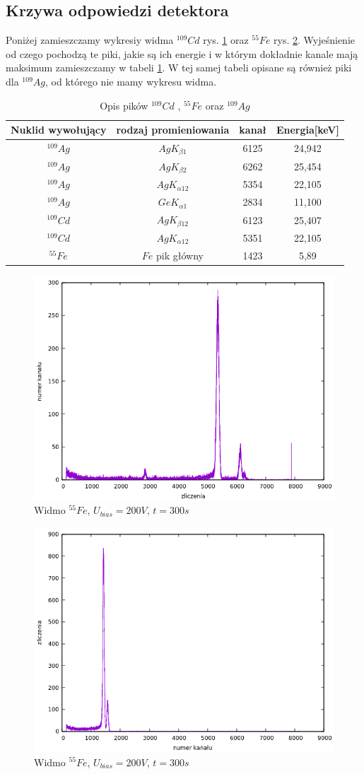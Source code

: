 \documentclass[11pt,a4paper]{article}
\begin{document}
\subsection{Krzywa odpowiedzi detektora}
Poniżej zamieszczamy wykresiy widma $^{109}Cd$ rys. \ref{figp1} oraz $^{55}Fe$ rys. \ref{figp2}. Wyjeśnienie od czego pochodzą te piki, jakie są ich energie i w którym dokładnie kanale mają maksimum zamieszczamy w tabeli \ref{tabodp}. W tej samej tabeli opisane są również piki dla $^{109}Ag$, od którego nie mamy wykresu widma.
\begin{longtable}{c|c|c|c}
\caption{Opis pików $^{109}Cd$ , $^{55}Fe$ oraz $^{109}Ag$}\\
\label{tabodp}
Nuklid wywołujący	&rodzaj promieniowania	&kanał	&Energia[keV]	\\ \hline
\endhead
$^{109}Ag$ 		& $Ag K_{\beta 1}$	&6125	&24,942		\\
$^{109}Ag$ 		& $Ag K_{\beta 2}$	&6262   &25,454		\\
$^{109}Ag$ 		& $Ag K_{\alpha 12}$	&5354	&22,105		\\
$^{109}Ag$	 	& $Ge K_{\alpha 1}$	&2834	&11,100		\\
$^{109}Cd$ 		& $Ag K_{\beta 12}$	&6123	&25,407		\\
$^{109}Cd$ 		& $Ag K_{\alpha 12}$	&5351	&22,105		\\
$^{55}Fe$ 		& $Fe$ pik główny	&1423	&5,89		\\
\end{longtable}
\begin{figure}[H]
\centering
\includegraphics[width=.7\linewidth]{kadm.png}
\caption{Widmo $^{55}Fe$, $U_{bias}=200V$, $t=300s$}
\label{figp1}
\end{figure}
\begin{figure}[H]
\centering
\includegraphics[width=.7\linewidth]{zelazo.png}
\caption{Widmo $^{55}Fe$, $U_{bias}=200V$, $t=300s$}
\label{figp2}
\end{figure}
\end{document}
